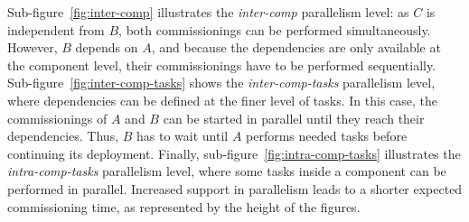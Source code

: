  Sub-figure~\ref{fig:inter-comp} illustrates the \emph{inter-comp}
parallelism level: as $C$ is independent from $B$, both commissionings
can be performed simultaneously. However, $B$ depends on $A$, and
because the dependencies are only available at the component level,
their commissionings have to be performed
sequentially. Sub-figure~\ref{fig:inter-comp-tasks} shows the
\emph{inter-comp-tasks} parallelism level, where dependencies can be
defined at the finer level of tasks. In this case, the commissionings
of $A$ and $B$ can be started in parallel until they reach their
dependencies. Thus, $B$ has to wait until $A$ performs needed tasks
before continuing its deployment. Finally,
sub-figure~\ref{fig:intra-comp-tasks} illustrates the
\emph{intra-comp-tasks} parallelism level, where some tasks inside a
component can be performed in parallel. Increased support in
parallelism leads to a shorter expected commissioning time, as
represented by the height of the figures.


